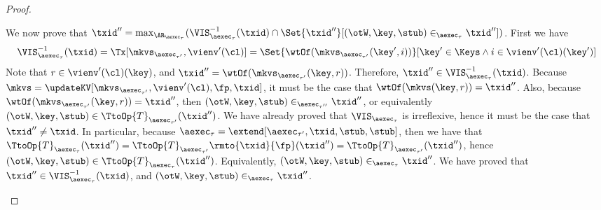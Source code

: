 \begin{proof}
\begin{itemize}
\begin{itemize}
We now prove that 
$\txid'' = \max_{\AR_{\aexec_{\tau}}}(\VIS^{-1}_{\aexec_{\tau}}(\txid) \cap \Set{ \txid'' }[ (\otW, \key, \stub) \in_{\aexec_{\tau}} \txid''])$. 
First we have
\[ 
\begin{array}{l}
\VIS^{-1}_{\aexec_{\tau}}(\txid) = 
\Tx[\mkvs_{\aexec_{\tau'}}, \vienv'(\cl)] = 
\Set{\wtOf(\mkvs_{\aexec_{\tau'}}(\key',  i)) }[ \key' \in \Keys \land  i \in \vienv'(\cl)(\key')]
\end{array}
\]
Note that $r \in \vienv'(\cl)(\key)$, and $\txid'' = \wtOf(\mkvs_{\aexec_{\tau'}}(\key, r))$. 
Therefore, $\txid'' \in \VIS^{-1}_{\aexec_{\tau}}(\txid)$. 
Because $\mkvs = \updateKV[\mkvs_{\aexec_{\tau'}}, \vienv'(\cl), \fp, \txid]$, it 
must be the case that $\wtOf(\mkvs(\key, r)) = \txid''$. Also, because $\wtOf(\mkvs_{\aexec_{\tau'}}(\key, r)) = \txid''$, 
then $(\otW, \key, \stub) \in_{\aexec_{\tau''}} \txid''$, or equivalently $(\otW, \key, \stub) \in \TtoOp{T}_{\aexec_{\tau'}}(\txid'')$. 
We have already proved that $\VIS_{\aexec_{\tau}}$ is irreflexive, hence it must be the case that $\txid'' \neq \txid$. 
In particular, because $\aexec_{\tau} = \extend[\aexec_{\tau'}, \txid, \stub, \stub]$, then we have that 
$\TtoOp{T}_{\aexec_{\tau}}(\txid'') = \TtoOp{T}_{\aexec_{\tau'}}\rmto{\txid}{\fp}(\txid'') = 
\TtoOp{T}_{\aexec_{\tau'}}(\txid'')$, hence $(\otW, \key, \stub) \in \TtoOp{T}_{\aexec_{\tau}}(\txid'')$. Equivalently, 
$(\otW, \key, \stub) \in_{\aexec_{\tau}} \txid''$. We have proved that $\txid'' \in \VIS^{-1}_{\aexec_{\tau}}(\txid)$, 
and $(\otW, \key, \stub) \in_{\aexec_{\tau}} \txid''$. 


\end{itemize}
\end{itemize}
\end{proof}
